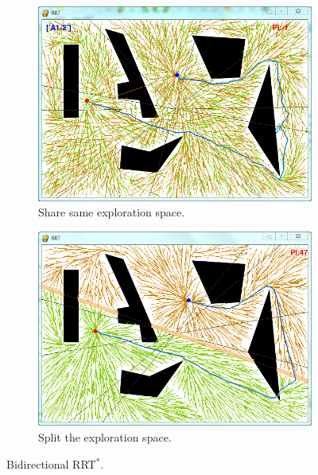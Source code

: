 \documentclass[letterpaper, 10 pt, conference]{ieeeconf}
\begin{document}
\begin{figure}
	\centering
	\begin{subfigure}[t]{0.47\linewidth}
		\centering
		\includegraphics[width=\textwidth]{fig/homotopyClassRRT.png}
		\caption{Share same exploration space.}
		\label{fig:homotopy_no_pref:all}
	\end{subfigure}  
	\begin{subfigure}[t]{0.47\linewidth}
		\centering
		\includegraphics[width=\textwidth]{fig/homotopyClassRRTHalf.png}
		\caption{Split the exploration space.}
		\label{fig:homotopy_no_pref:half}
	\end{subfigure}   
	\caption{Bidirectional RRT$^{*}$.}
	\label{fig:homotopy_no_pref}
\end{figure}
\end{document}
